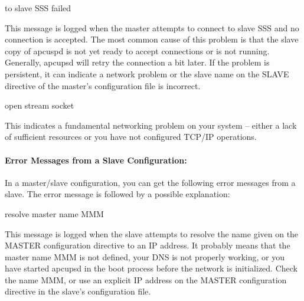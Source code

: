 {{{{{{{{{\label{Connect-to-slave-SSS-failed}

{\smallConnect to slave SSS failed}

This message is logged when the master attempts to connect to slave SSS and no
connection is accepted. The most common cause of this problem is that the
slave copy of apcuspd is not yet ready to accept connections or is not
running. Generally, apcupsd will retry the connection a bit later. If the
problem is persistent, it can indicate a network problem or the slave name on
the SLAVE directive of the master's configuration file is incorrect. 

\label{Cannot-open-stream-socket}

{\smallCannot open stream socket}

This indicates a fundamental networking problem on your system {--} either a
lack of sufficient resources or you have not configured TCP/IP operations. 

\label{Error-Messages-from-a-Slave-Configuration}

\paragraph*{Error Messages from a Slave Configuration:}

In a master/slave configuration, you can get the following error messages from
a slave. The error message is followed by a possible explanation: 

\label{Cannot-resolve-master-name-MMM}

{\smallCannot resolve master name MMM}

This message is logged when the slave attempts to resolve the name given on
the MASTER configuration directive to an IP address. It probably means that
the master name MMM is not defined, your DNS is not properly working, or you
have started apcupsd in the boot process before the network is initialized.
Check the name MMM, or use an explicit IP address on the MASTER configuration
directive in the slave's configuration file. 

\label{Cannot-bind-local-address_003b-probably-already-in-use}

}}}}}}}}}
